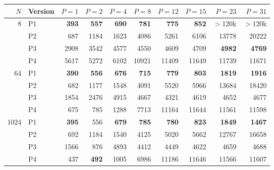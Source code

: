 \begin{tabular}{rlrrrrrrrr}
\toprule
$N$ & Version & $P{=}1$ & $P{=}2$ & $P{=}4$ & $P{=}8$ & $P{=}12$ & $P{=}15$ & $P{=}23$ & $P{=}31$ \\
\midrule
8 & P1 & \textbf{393} & \textbf{557} & \textbf{690} & \textbf{781} & \textbf{775} & \textbf{852} & $>$120k & $>$120k \\
 & P2 & 687 & 1184 & 1623 & 4086 & 5261 & 6106 & 13778 & 20222 \\
 & P3 & 2908 & 3542 & 4577 & 4550 & 4609 & 4709 & \textbf{4982} & \textbf{4769} \\
 & P4 & 5617 & 5272 & 6102 & 10921 & 11409 & 11649 & 11739 & 11671 \\
\midrule
64 & P1 & \textbf{390} & \textbf{556} & \textbf{676} & \textbf{715} & \textbf{779} & \textbf{803} & \textbf{1819} & \textbf{1916} \\
 & P2 & 682 & 1177 & 1548 & 4091 & 5520 & 5966 & 13684 & 18420 \\
 & P3 & 1854 & 2476 & 4915 & 4667 & 4321 & 4619 & 4652 & 4677 \\
 & P4 & 675 & 785 & 1288 & 7713 & 11164 & 11644 & 11561 & 11598 \\
\midrule
1024 & P1 & \textbf{395} & 556 & \textbf{679} & \textbf{785} & \textbf{780} & \textbf{823} & \textbf{1849} & \textbf{1467} \\
 & P2 & 692 & 1184 & 1540 & 4125 & 5020 & 5662 & 12767 & 16658 \\
 & P3 & 1566 & 876 & 4893 & 4412 & 4449 & 4622 & 4659 & 4688 \\
 & P4 & 437 & \textbf{492} & 1005 & 6986 & 11186 & 11646 & 11566 & 11607 \\
\bottomrule
\end{tabular}
